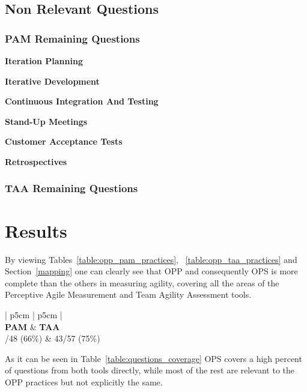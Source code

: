 \subsection{Non Relevant Questions}

\subsubsection{PAM Remaining Questions}

\textbf{Iteration Planning}

\textbf{Iterative Development}

\textbf{Continuous Integration And Testing}

\textbf{Stand-Up Meetings}

\textbf{Customer Acceptance Tests}

\textbf{Retrospectives}

\subsubsection{TAA Remaining Questions}

\section{Results}
By viewing Tables~\ref{table:opp_pam_practices}, ~\ref{table:opp_taa_practices} and Section~\ref{mapping} one can clearly see that OPP and consequently OPS is more complete than the others in measuring agility, covering all the areas of the Perceptive Agile Measurement and Team Agility Assessment tools.

\begin{table} [H]
	\begin{tabular}{{| p{5cm} | p{5cm} |}}
		\hline
		  \\ \hline
		\textbf{PAM} & \textbf{TAA}  \\ /48 (66\%) & 43/57 (75\%) \\ \hline
	\end{tabular}
\label{table:questions_coverage}
\end{table}

As it can be seen in Table~\ref{table:questions_coverage} OPS covers a high percent of questions from both tools directly, while most of the rest are relevant to the OPP practices but not explicitly the same.



